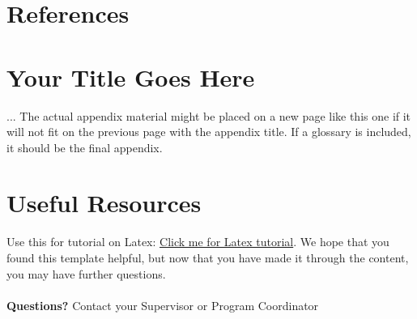 \documentclass[12pt]{report}
\begin{document}
\chapter*{References}
\printbibliography[heading=none]

\appendix
\renewcommand\chaptername{Appendix}

\chapter{Your Title Goes Here}
...
\newpage
The actual appendix material might be placed on a new page like this one if it will not fit on the previous page with the appendix title. If a glossary is included, it should be the final appendix.

\chapter{Useful Resources}
Use this for tutorial on Latex: \href{https://www.overleaf.com/learn/latex/Tutorials}{Click me for Latex tutorial}. We hope that you found this template helpful, but now that you have made it through the content, you may have further questions.
\\
\\
\textbf{Questions?} 
Contact your Supervisor or Program Coordinator 
\end{document}
